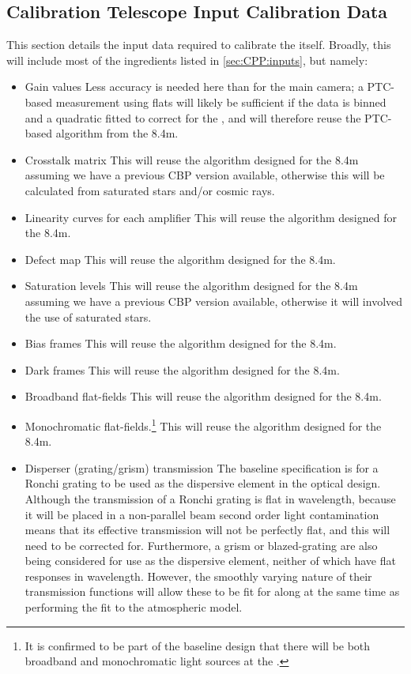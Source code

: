

\subsection{Calibration Telescope Input Calibration Data}
\label{sec:CPP:auxTelescope:inputs}
This section details the input data required to calibrate the \auxtelescope itself. Broadly, this will include most of the ingredients listed in \secsymbol\ref{sec:CPP:inputs}, but namely:

\begin{itemize}
	\item Gain values 
	\subitem Less accuracy is needed here than for the main camera; a PTC-based measurement using flats will likely be sufficient if the data is binned and a quadratic fitted to correct for the \bfeffect, and will therefore reuse the PTC-based algorithm from the 8.4m. 
	\item Crosstalk matrix
	\subitem This will reuse the algorithm designed for the 8.4m assuming we have a previous CBP version available, otherwise this will be calculated from saturated stars and/or cosmic rays.
	\item Linearity curves for each amplifier
	\subitem This will reuse the algorithm designed for the 8.4m.
	\item Defect map
	\subitem This will reuse the algorithm designed for the 8.4m.
	\item Saturation levels
	\subitem This will reuse the algorithm designed for the 8.4m assuming we have a previous CBP version available, otherwise it will involved the use of saturated stars.
	\item Bias frames
	\subitem This will reuse the algorithm designed for the 8.4m.
	\item Dark frames
	\subitem This will reuse the algorithm designed for the 8.4m.
	\item Broadband flat-fields
	\subitem This will reuse the algorithm designed for the 8.4m.
	\item Monochromatic flat-fields.\footnote{ It is confirmed to be part of the baseline design that there will be both broadband and monochromatic light sources at the \auxtelescope.}
	\subitem This will reuse the algorithm designed for the 8.4m.
	\item Disperser (grating/grism) transmission
	\subitem The baseline specification is for a Ronchi grating to be used as the dispersive element in the optical design. Although the transmission of a Ronchi grating is flat in wavelength, because it will be placed in a non-parallel beam second order light contamination means that its effective transmission will not be perfectly flat, and this will need to be corrected for. Furthermore, a grism or blazed-grating are also being considered for use as the dispersive element, neither of which have flat responses in wavelength. However, the smoothly varying nature of their transmission functions will allow these to be fit for along at the same time as performing the fit to the atmospheric model.

\end{itemize}

